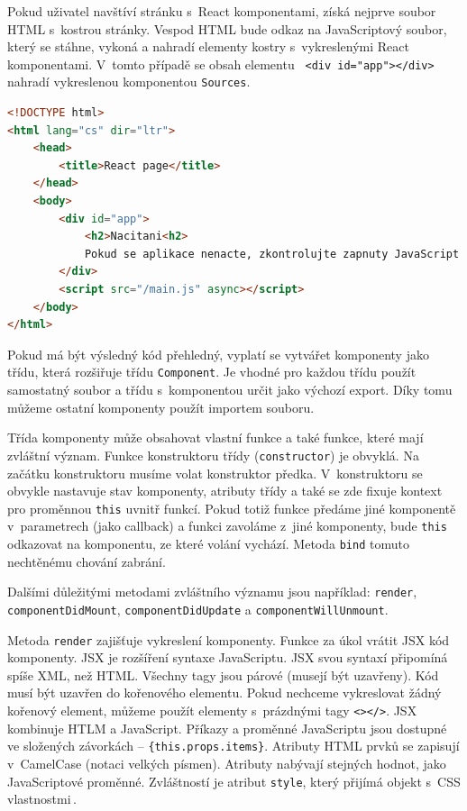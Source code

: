 Pokud uživatel navštíví stránku s~React komponentami, získá nejprve soubor HTML s~kostrou stránky. Vespod HTML bude odkaz na JavaScriptový soubor, který se stáhne, vykoná a nahradí elementy kostry s~vykreslenými React komponentami. V~tomto případě se obsah elementu \texttt{ <div id="{}app"{}></div>} nahradí vykreslenou komponentou \texttt{Sources}.
\begin{lstlisting}[language=HTML]
<!DOCTYPE html>
<html lang="cs" dir="ltr">
    <head>
        <title>React page</title>
    </head>
    <body>
        <div id="app">
            <h2>Nacitani<h2>
            Pokud se aplikace nenacte, zkontrolujte zapnuty JavaScript
        </div>
        <script src="/main.js" async></script>
    </body>
</html>
\end{lstlisting}

Pokud má být výsledný kód přehledný, vyplatí se vytvářet komponenty jako třídu, která rozšiřuje třídu \texttt{Component}. Je vhodné pro každou třídu použít samostatný soubor a třídu s~komponentou určit jako výchozí export. Díky tomu můžeme ostatní komponenty použít importem souboru.

Třída komponenty může obsahovat vlastní funkce a také funkce, které mají zvláštní význam. Funkce konstruktoru třídy (\texttt{constructor}) je obvyklá. Na začátku konstruktoru musíme volat konstruktor předka. V~konstruktoru se obvykle nastavuje stav komponenty, atributy třídy a také se zde fixuje kontext pro proměnnou \texttt{this} uvnitř funkcí. Pokud totiž funkce předáme jiné komponentě v~parametrech (jako callback) a funkci zavoláme z~jiné komponenty, bude \texttt{this} odkazovat na komponentu, ze které volání vychází. Metoda \texttt{bind} tomuto nechtěnému chování zabrání.

Dalšími důležitými metodami zvláštního významu jsou například: \texttt{render}, \texttt{componentDidMount}, \texttt{componentDidUpdate} a \texttt{componentWillUnmount}.

Metoda \texttt{render} zajišťuje vykreslení komponenty. Funkce za úkol vrátit JSX kód komponenty. JSX je rozšíření syntaxe JavaScriptu. JSX svou syntaxí připomíná spíše XML, než HTML. Všechny tagy jsou párové (musejí být uzavřeny). Kód musí být uzavřen do kořenového elementu. Pokud nechceme vykreslovat žádný kořenový element, můžeme použít elementy s~prázdnými tagy \texttt{<></>}. JSX kombinuje HTLM a JavaScript. Příkazy a proměnné JavaScriptu jsou dostupné ve složených závorkách -- \texttt{\{this.props.items\}}. Atributy HTML prvků se zapisují v~CamelCase (notaci velkých písmen). Atributy nabývají stejných hodnot, jako JavaScriptové proměnné. Zvláštností je atribut \texttt{style}, který přijímá objekt s~CSS vlastnostmi\,\cite{jsx}.

